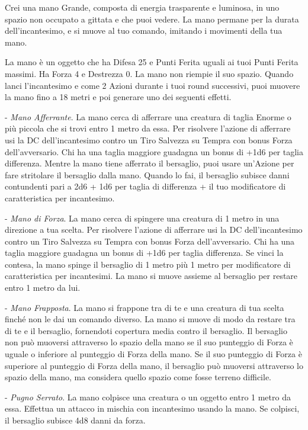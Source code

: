 \begin{multicols}{2}
Crei una mano Grande, composta di energia trasparente e luminosa, in uno spazio non occupato a gittata e che puoi vedere. La mano permane per la durata dell'incantesimo, e si muove al tuo comando, imitando i movimenti della tua mano.

La mano è un oggetto che ha Difesa 25 e Punti Ferita uguali ai tuoi Punti Ferita massimi. Ha Forza 4 e Destrezza 0. La mano non riempie il suo spazio.
Quando lanci l'incantesimo e come 2 Azioni durante i tuoi round successivi, puoi muovere la mano fino a 18 metri e poi generare uno dei seguenti effetti.

\medskip

- \emph{Mano Afferrante}. La mano cerca di afferrare una creatura di taglia Enorme o più piccola che si trovi entro 1 metro da essa. Per risolvere l'azione di afferrare usi la DC dell'incantesimo contro un Tiro Salvezza su Tempra con bonus Forza dell'avversario. 
Chi ha una taglia maggiore guadagna un bonus di +1d6 per taglia differenza.
Mentre la mano tiene afferrato il bersaglio, puoi usare un'Azione per fare stritolare il bersaglio dalla mano. Quando lo fai, il bersaglio subisce danni contundenti pari a 2d6 + 1d6 per taglia di differenza + il tuo modificatore di caratteristica per incantesimo.

- \emph{Mano di Forza}. La mano cerca di spingere una creatura di 1 metro in una direzione a tua scelta. Per risolvere l'azione di afferrare usi la DC dell'incantesimo contro un Tiro Salvezza su Tempra con bonus Forza dell'avversario. Chi ha una taglia maggiore guadagna un bonus di +1d6 per taglia differenza.
Se vinci la contesa, la mano spinge il bersaglio di 1 metro più 1 metro per modificatore di caratteristica per incantesimi. La mano si muove assieme al bersaglio per restare entro 1 metro da lui.

- \emph{Mano Frapposta}. La mano si frappone tra di te e una creatura di tua scelta finché non le dai un comando diverso. La mano si muove di modo da restare tra di te e il bersaglio, fornendoti copertura media contro il bersaglio. Il bersaglio non può muoversi attraverso lo spazio della mano se il suo punteggio di Forza è uguale o inferiore al punteggio di Forza della mano. Se il suo punteggio di Forza è superiore al punteggio di Forza della mano, il bersaglio può muoversi attraverso lo spazio della mano, ma considera quello spazio come fosse terreno difficile.

- \emph{Pugno Serrato}. La mano colpisce una creatura o un oggetto entro 1 metro da essa. Effettua un attacco in mischia con incantesimo usando la mano. Se colpisci, il bersaglio subisce 4d8 danni da forza.


\end{multicols}
